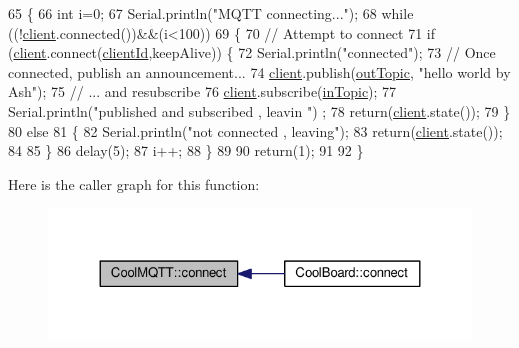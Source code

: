 \begin{DoxyCode}
65 \{       
66     \textcolor{keywordtype}{int} i=0;
67     Serial.println(\textcolor{stringliteral}{"MQTT connecting..."});
68     \textcolor{keywordflow}{while} ((!\hyperlink{classCoolMQTT_a4ca71e4f76ef868692a297efd45b1415}{client}.connected())&&(i<100)) 
69     \{
70         \textcolor{comment}{// Attempt to connect}
71         \textcolor{keywordflow}{if} (\hyperlink{classCoolMQTT_a4ca71e4f76ef868692a297efd45b1415}{client}.connect(\hyperlink{classCoolMQTT_af01bc6160c5a191e90df1b6e7318828d}{clientId},keepAlive)) \{
72             Serial.println(\textcolor{stringliteral}{"connected"});
73             \textcolor{comment}{// Once connected, publish an announcement...}
74             \hyperlink{classCoolMQTT_a4ca71e4f76ef868692a297efd45b1415}{client}.publish(\hyperlink{classCoolMQTT_a109c786a17b463f9eeba046194279522}{outTopic}, \textcolor{stringliteral}{"hello world by Ash"});
75             \textcolor{comment}{// ... and resubscribe}
76             \hyperlink{classCoolMQTT_a4ca71e4f76ef868692a297efd45b1415}{client}.subscribe(\hyperlink{classCoolMQTT_a4492f52a441e83cc5151010317fdb52d}{inTopic});
77             Serial.println(\textcolor{stringliteral}{"published and subscribed , leavin "}) ;
78             \textcolor{keywordflow}{return}(\hyperlink{classCoolMQTT_a4ca71e4f76ef868692a297efd45b1415}{client}.state());
79         \}
80         \textcolor{keywordflow}{else}
81         \{
82             Serial.println(\textcolor{stringliteral}{"not connected , leaving"});
83             \textcolor{keywordflow}{return}(\hyperlink{classCoolMQTT_a4ca71e4f76ef868692a297efd45b1415}{client}.state());
84             
85         \}
86     delay(5);
87     i++;
88     \}
89     
90     \textcolor{keywordflow}{return}(1);
91 
92 \}
\end{DoxyCode}
Here is the caller graph for this function\+:
\nopagebreak
\begin{figure}[H]
\begin{center}
\leavevmode
\includegraphics[width=324pt]{classCoolMQTT_a58b0b1f64b269c2681685208262fba1d_icgraph}
\end{center}
\end{figure}
\mbox{\label{classCoolMQTT_aa5eaae967b562b62cbcf2b8d81f6e5d5}} 
